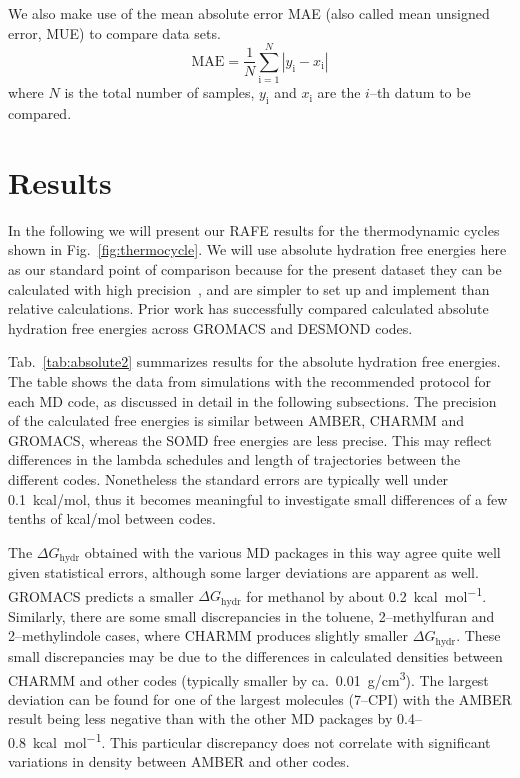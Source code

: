 \documentclass[journal=jctcce,manuscript=article]{achemso}
\begin{document}
We also make use of the mean absolute error MAE (also called mean unsigned
error, MUE) to compare data sets.
\begin{equation}
\label{eq:MUE}
\mathrm{MAE} = \frac{1}{N}\sum_\mathrm{i=1}^N \left | y_\mathrm{i} -
x_\mathrm{i} \right |
\end{equation}
where $N$ is the total number of samples, $y_\mathrm{i}$ and $x_\mathrm{i}$ are
the $i$--th datum to be compared.


\section{Results}
\label{sec:results}

In the following we will present our RAFE results for the
thermodynamic cycles shown in Fig.~\ref{fig:thermocycle}.  We will use
absolute hydration free energies here as our standard point of
comparison because for the present dataset they can be calculated with
high precision~\cite{doi:10.1021/acs.jced.7b00104}, and are simpler to
set up and implement than relative calculations.  Prior work has
successfully compared calculated absolute hydration free energies
across GROMACS and DESMOND codes.~\cite{klimovich_predicting_2010}

Tab.~\ref{tab:absolute2} summarizes results for the absolute hydration
free energies.  The table shows the data
from simulations with the recommended protocol for each MD code, as
discussed in detail in the following subsections.
The  precision of the calculated free energies is similar between
AMBER, CHARMM and GROMACS, whereas the SOMD free energies are less
precise.  This may reflect differences in the lambda schedules and
length of trajectories between the different codes.  Nonetheless the
standard errors are typically well under \SI{0.1}{kcal/mol}, thus it
becomes meaningful to investigate small differences of a few tenths of
\si{kcal/mol} between codes.

The $\Delta G_{\mathrm{hydr}}$
obtained with the various MD packages in
this way agree quite well given statistical errors, although some larger deviations are apparent as
well.  GROMACS predicts a smaller $\Delta G_{\mathrm{hydr}}$ for
methanol by about \SI{+0.2}{kcal.mol^{-1}}.  Similarly, there are some
small discrepancies in the toluene, 2--methylfuran and 2--methylindole
cases, where CHARMM produces slightly smaller $\Delta
G_{\mathrm{hydr}}$.  These small discrepancies may be due to the
differences in calculated densities between CHARMM and other codes
(typically smaller by ca.\ \SI{0.01}{g/cm^3}).
The largest deviation can be found for one of the largest
molecules (7--CPI) with the AMBER result being less negative than with
the other MD packages by 0.4--\SI{0.8}{kcal.mol^{-1}}.  This
particular discrepancy does not correlate with significant variations
in density between AMBER and other codes.
\end{document}
